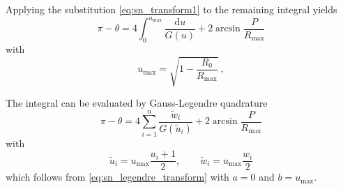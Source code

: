 Applying the substitution \cref{eq:sn_transform1} to the remaining integral yields
%
\begin{equation}
    \pi - \theta =
        4 \int_0^{u_\mathrm{max} } \frac{ \mathrm{d}u }{G(u)} +
        2 \arcsin \frac{P}{R_\mathrm{max}}
\end{equation}
%
with
%
\begin{equation}
    \label{eq:sn_umax}
    u_\mathrm{max} = \sqrt{ 1 - \frac{ R_0 }{ R_\mathrm{max} } } ~,
\end{equation}

The integral can be evaluated by Gauss-Legendre quadrature
%
\begin{equation}
    \label{eq:sn_cmangl_legendre_theta_chi_finite_approx_plain}
    \pi - \theta =
        4 \sum_{i=1}^n \frac{ \tilde{w}_i }{G(\tilde{u}_i)} +
        2 \arcsin \frac{P}{R_\mathrm{max}}
\end{equation}
%
with
%
\begin{equation}
    \label{eq:sn_gauss_legendre_transform_finite}
    \tilde{u}_i = u_\mathrm{max} \frac{ u_i + 1 }{ 2 }, \qquad
    \tilde{w}_i = u_\mathrm{max} \frac{ w_i }{ 2 }
\end{equation}
%
which follows from \cref{eq:sn_legendre_transform} with $a=0$ and $b=u_\mathrm{max}$.

